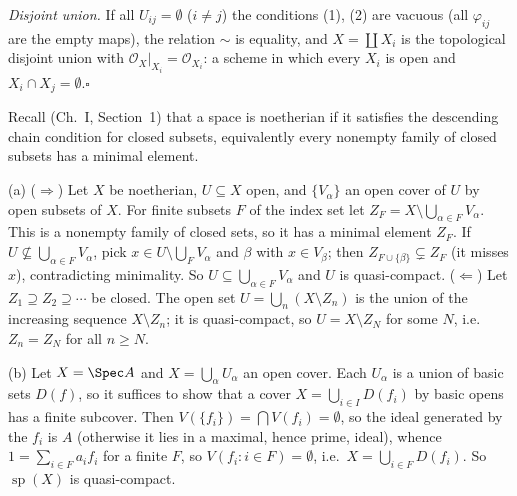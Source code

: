 \documentclass[11pt]{article}
\begin{document}
\emph{Disjoint union.} If all $U_{ij}=\emptyset$ ($i\neq j$) the conditions (1), (2) are vacuous (all $\varphi_{ij}$ are the empty maps), the relation $\sim$ is equality, and $X=\coprod X_i$ is the topological disjoint union with $\mathcal O_X|_{X_i}=\mathcal O_{X_i}$: a scheme in which every $X_i$ is open and $X_i\cap X_j=\emptyset$.\hfill$\square$

\pf
Recall (Ch.~I, Section~1) that a space is noetherian if it satisfies the descending chain condition for closed subsets, equivalently every nonempty family of closed subsets has a minimal element.

(a) ($\Rightarrow$) Let $X$ be noetherian, $U\subseteq X$ open, and $\{V_\alpha\}$ an open cover of $U$ by open subsets of $X$. For finite subsets $F$ of the index set let $Z_F=X\setminus\bigcup_{\alpha\in F}V_\alpha$. This is a nonempty family of closed sets, so it has a minimal element $Z_F$. If $U\not\subseteq\bigcup_{\alpha\in F}V_\alpha$, pick $x\in U\setminus\bigcup_FV_\alpha$ and $\beta$ with $x\in V_\beta$; then $Z_{F\cup\{\beta\}}\subsetneq Z_F$ (it misses $x$), contradicting minimality. So $U\subseteq\bigcup_{\alpha\in F}V_\alpha$ and $U$ is quasi-compact.
($\Leftarrow$) Let $Z_1\supseteq Z_2\supseteq\cdots$ be closed. The open set $U=\bigcup_n(X\setminus Z_n)$ is the union of the increasing sequence $X\setminus Z_n$; it is quasi-compact, so $U=X\setminus Z_N$ for some $N$, i.e.\ $Z_n=Z_N$ for all $n\ge N$.

(b) Let $X=\Spec A$ and $X=\bigcup_\alpha U_\alpha$ an open cover. Each $U_\alpha$ is a union of basic sets $D(f)$, so it suffices to show that a cover $X=\bigcup_{i\in I}D(f_i)$ by basic opens has a finite subcover. Then $V(\{f_i\})=\bigcap V(f_i)=\emptyset$, so the ideal generated by the $f_i$ is $A$ (otherwise it lies in a maximal, hence prime, ideal), whence $1=\sum_{i\in F}a_if_i$ for a finite $F$, so $V(f_i:i\in F)=\emptyset$, i.e.\ $X=\bigcup_{i\in F}D(f_i)$. So $\operatorname{sp}(X)$ is quasi-compact.
\end{document}
